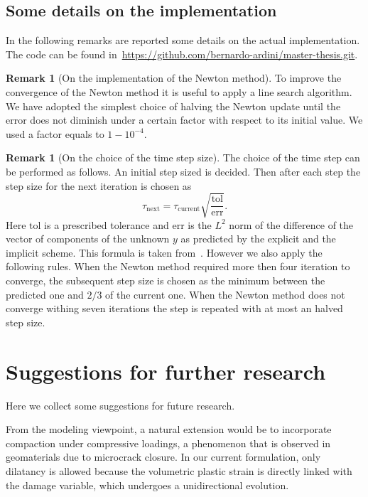 \documentclass[a4paper,10pt,oneside]{amsbook}
\numberwithin{section}{chapter}
\numberwithin{equation}{chapter}
\theoremstyle{definition}
\newtheorem{rmk}[prop]{Remark}
\begin{document}
\subsection{Some details on the implementation}

In the following remarks are reported some details on the actual implementation. The code can be found in~\url{https://github.com/bernardo-ardini/master-thesis.git}.

\begin{rmk}[On the implementation of the Newton method]
To improve the convergence of the Newton method it is useful to apply a line search algorithm. We have adopted the simplest choice of halving the Newton update until the error does not diminish under a certain factor with respect to its initial value. We used a factor equals to $1-10^{-4}$.
\end{rmk}
\begin{rmk}[On the choice of the time step size]
The choice of the time step can be performed as follows. An initial step sized is decided. Then after each step the step size for the next iteration is chosen as
\[
\tau_\text{next}=\tau_\text{current}\sqrt{\frac{\text{tol}}{\text{err}}}.
\]
Here $\text{tol}$ is a prescribed tolerance and $\text{err}$ is the $L^2$ norm of the difference of the vector of components of the unknown $y$ as predicted by the explicit and the implicit scheme. This formula is taken from~\cite{hairer1993solving}. However we also apply the following rules. When the Newton method required more then four iteration to converge, the subsequent step size is chosen as the minimum between the predicted one and $2/3$ of the current one. When the Newton method does not converge withing seven iterations the step is repeated with at most an halved step size. 
\end{rmk}

\section{Suggestions for further research}

Here we collect some suggestions for future research.

From the modeling viewpoint, a natural extension would be to incorporate compaction under compressive loadings, a phenomenon that is observed in geomaterials due to microcrack closure. In our current formulation, only dilatancy is allowed because the volumetric plastic strain is directly linked with the damage variable, which undergoes a unidirectional evolution.
\end{document}
